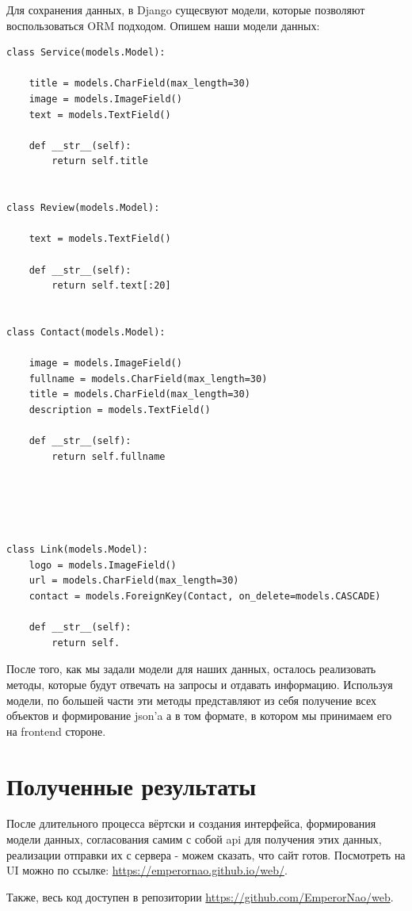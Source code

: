 \documentclass{article}
\begin{document}
Для сохранения данных, в Django сущесвуют модели, которые позволяют воспользоваться ORM подходом.
Опишем наши модели данных: 

\begin{lstlisting}
class Service(models.Model):

    title = models.CharField(max_length=30)
    image = models.ImageField()
    text = models.TextField()

    def __str__(self):
        return self.title


class Review(models.Model):

    text = models.TextField()

    def __str__(self):
        return self.text[:20]


class Contact(models.Model):

    image = models.ImageField()
    fullname = models.CharField(max_length=30)
    title = models.CharField(max_length=30)
    description = models.TextField()

    def __str__(self):
        return self.fullname





class Link(models.Model):
    logo = models.ImageField()
    url = models.CharField(max_length=30)
    contact = models.ForeignKey(Contact, on_delete=models.CASCADE)

    def __str__(self):
        return self.
\end{lstlisting}      

После того, как мы задали модели для наших данных, осталось реализовать методы, которые будут отвечать на запросы и отдавать информацию. Используя модели, по большей части эти методы представляют из себя получение всех объектов и формирование json'a а в том формате, в котором мы принимаем его на frontend стороне. 


\section{Полученные результаты}
После длительного процесса вёртски и создания интерфейса, формирования модели данных, согласования самим с собой api для получения этих данных, реализации отправки их с сервера - можем сказать, что сайт готов. Посмотреть на UI можно по ссылке: \href{https://emperornao.github.io/web/}{https://emperornao.github.io/web/}.

Также, весь код доступен в репозитории \href{https://github.com/EmperorNao/web}{https://github.com/EmperorNao/web}.
\end{document}
